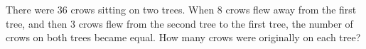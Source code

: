 There were $36$ crows sitting on two trees. When $8$ crows flew away from the first tree, and then $3$ crows flew from the second tree to the first tree, the number of crows on both trees became equal. How many crows were originally on each tree?

